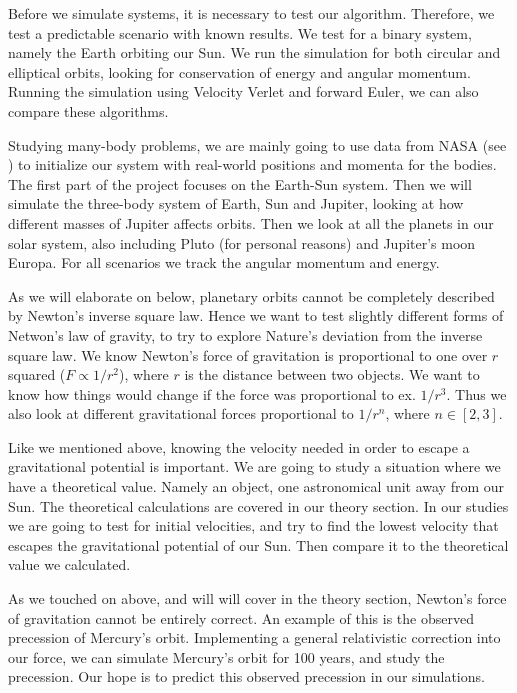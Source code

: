 \documentclass[reprint, english,notitlepage,nofootinbib]{revtex4-1}  %
\begin{document}
Before we simulate systems, it is necessary to test our algorithm. Therefore, we test a predictable scenario with known results. We test for a binary system, namely the Earth orbiting our Sun. We run the simulation for both circular and elliptical orbits, looking for conservation of energy and angular momentum. Running the simulation using Velocity Verlet and forward Euler, we can also compare these algorithms.

Studying many-body problems, we are mainly going to use data from NASA (see \citep{NASA}) to initialize our system with real-world positions and momenta for the bodies. The first part of the project focuses on the Earth-Sun system. Then we will simulate the three-body system of Earth, Sun and Jupiter, looking at how different masses of Jupiter affects orbits. Then we look at all the planets in our solar system, also including Pluto (for personal reasons) and Jupiter's moon Europa. For all scenarios we track the angular momentum and energy.

As we will elaborate on below, planetary orbits cannot be completely described by Newton's inverse square law. Hence we want to test slightly different forms of Netwon's law of gravity, to try to explore Nature's deviation from the inverse square law. We know Newton's force of gravitation is proportional to one over $r$ squared ($F\propto1/r^2$), where $r$ is the distance between two objects. We want to know how things would change if the force was proportional to ex. $1/r^3$. Thus we also look at different gravitational forces proportional to $1/r^n$, where $n\in [2,3]$.

Like we mentioned above, knowing the velocity needed in order to escape a gravitational potential is important. We are going to study a situation where we have a theoretical value. Namely an object, one astronomical unit away from our Sun. The theoretical calculations are covered in our theory section. In our studies we are going to test for initial velocities, and try to find the lowest velocity that escapes the gravitational potential of our Sun. Then compare it to the theoretical value we calculated.

As we touched on above, and will will cover in the theory section, Newton's force of gravitation cannot be entirely correct. An example of this is the observed precession of Mercury's orbit. Implementing a general relativistic correction into our force, we can simulate Mercury's orbit for 100 years, and study the precession. Our hope is to predict this observed precession in our simulations.
\end{document}
